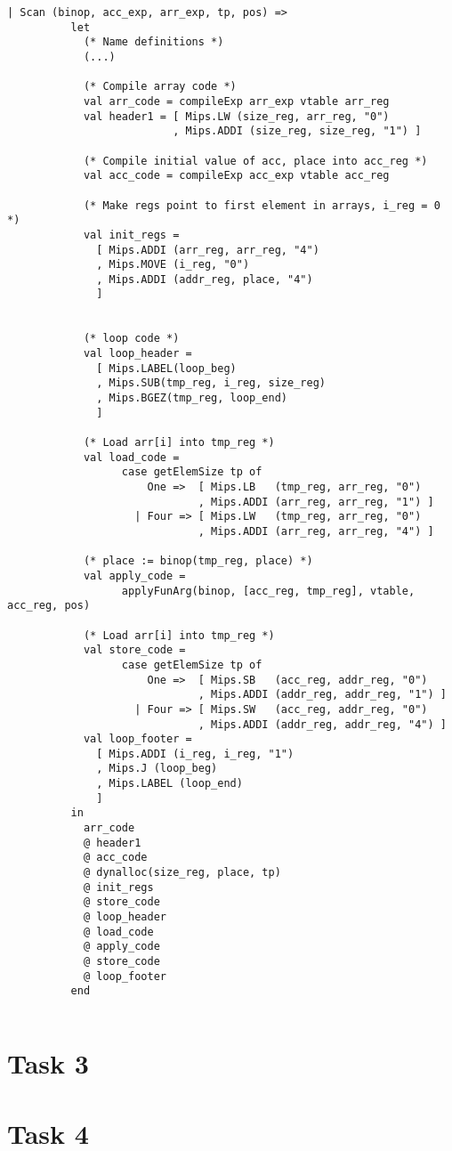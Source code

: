 \documentclass[10pt]{article}
\begin{document}
\begin{Verbatim}[frame=single]
      | Scan (binop, acc_exp, arr_exp, tp, pos) =>
          let
			(* Name definitions *)
			(...)
  
            (* Compile array code *)
            val arr_code = compileExp arr_exp vtable arr_reg
            val header1 = [ Mips.LW (size_reg, arr_reg, "0")
                          , Mips.ADDI (size_reg, size_reg, "1") ]
  
            (* Compile initial value of acc, place into acc_reg *)
            val acc_code = compileExp acc_exp vtable acc_reg
  
            (* Make regs point to first element in arrays, i_reg = 0 *)
            val init_regs =
              [ Mips.ADDI (arr_reg, arr_reg, "4")
              , Mips.MOVE (i_reg, "0")
              , Mips.ADDI (addr_reg, place, "4")
              ]
  
  
            (* loop code *)
            val loop_header =
              [ Mips.LABEL(loop_beg)
              , Mips.SUB(tmp_reg, i_reg, size_reg)
              , Mips.BGEZ(tmp_reg, loop_end)
              ]
  
            (* Load arr[i] into tmp_reg *)
            val load_code =
                  case getElemSize tp of
                      One =>  [ Mips.LB   (tmp_reg, arr_reg, "0")
                              , Mips.ADDI (arr_reg, arr_reg, "1") ]
                    | Four => [ Mips.LW   (tmp_reg, arr_reg, "0")
                              , Mips.ADDI (arr_reg, arr_reg, "4") ]
  
            (* place := binop(tmp_reg, place) *)
            val apply_code =
                  applyFunArg(binop, [acc_reg, tmp_reg], vtable, acc_reg, pos)
  
            (* Load arr[i] into tmp_reg *)
            val store_code =
                  case getElemSize tp of
                      One =>  [ Mips.SB   (acc_reg, addr_reg, "0")
                              , Mips.ADDI (addr_reg, addr_reg, "1") ]
                    | Four => [ Mips.SW   (acc_reg, addr_reg, "0")
                              , Mips.ADDI (addr_reg, addr_reg, "4") ]
            val loop_footer =
              [ Mips.ADDI (i_reg, i_reg, "1")
              , Mips.J (loop_beg)
              , Mips.LABEL (loop_end)
              ]
          in
            arr_code
            @ header1
            @ acc_code
            @ dynalloc(size_reg, place, tp)
            @ init_regs
            @ store_code
            @ loop_header
            @ load_code
            @ apply_code
            @ store_code
            @ loop_footer
          end

\end{Verbatim}

\begin{Verbatim}[frame=single]

\end{Verbatim}

\section{Task 3}
\section{Task 4}

\begin{Verbatim}[frame=single]

\end{Verbatim}
\end{document}
